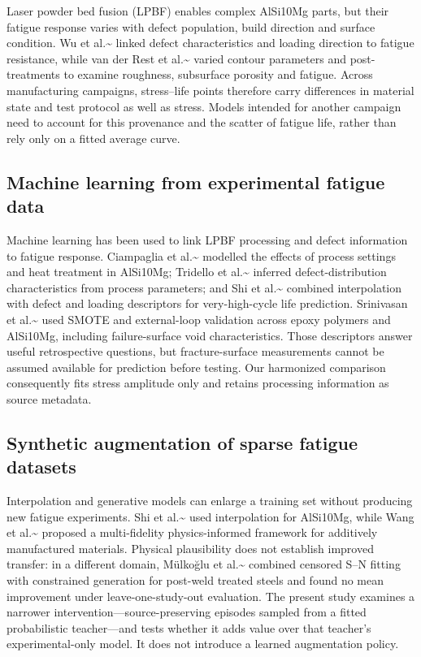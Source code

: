 \documentclass[12pt,a4paper]{article}
\begin{document}
Laser powder bed fusion (LPBF) enables complex AlSi10Mg parts, but their fatigue response varies with defect population, build direction and surface condition. Wu et al.\textasciitilde{}\cite{wu2021} linked defect characteristics and loading direction to fatigue resistance, while van der Rest et al.\textasciitilde{}\cite{vanderrest2025} varied contour parameters and post-treatments to examine roughness, subsurface porosity and fatigue. Across manufacturing campaigns, stress–life points therefore carry differences in material state and test protocol as well as stress. Models intended for another campaign need to account for this provenance and the scatter of fatigue life, rather than rely only on a fitted average curve.

\subsection{Machine learning from experimental fatigue data}

Machine learning has been used to link LPBF processing and defect information to fatigue response. Ciampaglia et al.\textasciitilde{}\cite{ciampaglia2023} modelled the effects of process settings and heat treatment in AlSi10Mg; Tridello et al.\textasciitilde{}\cite{tridello2023b} inferred defect-distribution characteristics from process parameters; and Shi et al.\textasciitilde{}\cite{shi2023} combined interpolation with defect and loading descriptors for very-high-cycle life prediction. Srinivasan et al.\textasciitilde{}\cite{srinivasan2024} used SMOTE and external-loop validation across epoxy polymers and AlSi10Mg, including failure-surface void characteristics. Those descriptors answer useful retrospective questions, but fracture-surface measurements cannot be assumed available for prediction before testing. Our harmonized comparison consequently fits stress amplitude only and retains processing information as source metadata.

\subsection{Synthetic augmentation of sparse fatigue datasets}

Interpolation and generative models can enlarge a training set without producing new fatigue experiments. Shi et al.\textasciitilde{}\cite{shi2023} used interpolation for AlSi10Mg, while Wang et al.\textasciitilde{}\cite{wang2025} proposed a multi-fidelity physics-informed framework for additively manufactured materials. Physical plausibility does not establish improved transfer: in a different domain, Mülkoğlu et al.\textasciitilde{}\cite{mulkoglu2026} combined censored S–N fitting with constrained generation for post-weld treated steels and found no mean improvement under leave-one-study-out evaluation. The present study examines a narrower intervention—source-preserving episodes sampled from a fitted probabilistic teacher—and tests whether it adds value over that teacher’s experimental-only model. It does not introduce a learned augmentation policy.
\end{document}
